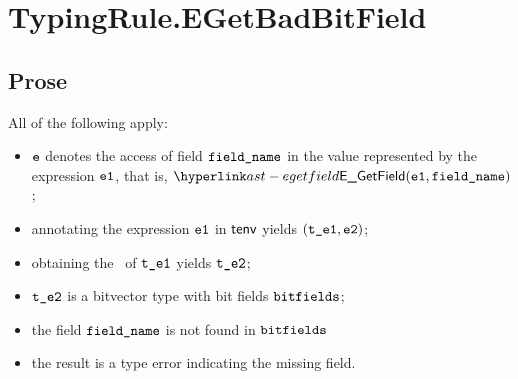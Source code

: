 
\section{TypingRule.EGetBadBitField \label{sec:TypingRule.EGetBadBitField}}

\subsection{Prose}
All of the following apply:
\begin{itemize}
  \item $\ve$ denotes the access of field $\fieldname$ in the value represented by the expression $\veone$, that is, $\EGetField(\veone, \fieldname)$;
  \item annotating the expression $\veone$ in $\tenv$ yields $(\vteone, \vetwo)$\ProseOrTypeError;
  \item obtaining the \underlyingtype\ of $\vteone$ yields $\vtetwo$\ProseOrTypeError;
  \item $\vtetwo$ is a bitvector type with bit fields $\bitfields$;
  \item the field $\fieldname$ is not found in $\bitfields$
  \item the result is a type error indicating the missing field.
\end{itemize}



\begin{mathpar}
\end{mathpar}

